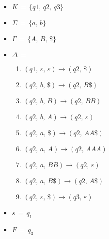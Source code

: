 \begin{tcolorbox}[colback=yellow!15!white, colframe=blue!50!white,
	fonttitle=\bfseries\Large, title = {PDA $M = (K,\, \Sigma,\, \Gamma,\, \Delta,\, s,\, F)$}]
\begin{itemize}
	\itemsep0em
	\item $K \,=\, \{q1,\, q2,\, q3\}$
	\reducevspace\reducevspace\reducevspace
	\item $\Sigma \,=\, \{a,\, b\}$
	\reducevspace\reducevspace\reducevspace
	\item $\Gamma \,=\, \{A,\, B,\, \$\}$
	\reducevspace\reducevspace\reducevspace
	\item $\Delta \,=\,$
	\reducevspace\reducevspace\reducevspace\reducevspace\reducevspace\reducevspace\reducevspace
	\reducevspace\reducevspace\reducevspace\reducevspace\reducevspace\reducevspace\reducevspace
		\begin{multicols}{2}
		\begin{enumerate}
			\item $(q1,\,ε,\,ε)\rightarrow(q2,\,\$)$



			\item $(q2,\,b,\,\$)\rightarrow(q2,\,B\$)$
			\item $(q2,\,b,\,B)\rightarrow(q2,\,BB)$
			\item $(q2,\,b,\,Α)\rightarrow(q2,\,ε)$

			\item $(q2,\,a,\,\$)\rightarrow(q2,\,AA\$)$
			\item $(q2,\,a,\,A)\rightarrow(q2,\,AAA)$
			\item $(q2,\,a,\,BB)\rightarrow(q2,\,ε)$
			\item $(q2,\,a,\,B\$)\rightarrow(q2,\,A\$)$

			\item $(q2,\,ε,\,\$)\rightarrow(q3,\,ε)$
		\end{enumerate}
		\end{multicols}
		\reducevspace\reducevspace\reducevspace\reducevspace\reducevspace
		\reducevspace\reducevspace\reducevspace\reducevspace\reducevspace
	\item $s \,=\, q_1$
	\reducevspace\reducevspace\reducevspace
	\item $F \,=\, q_3$
\end{itemize}
\end{tcolorbox}
\reducevspace\reducevspace\reducevspace\reducevspace



